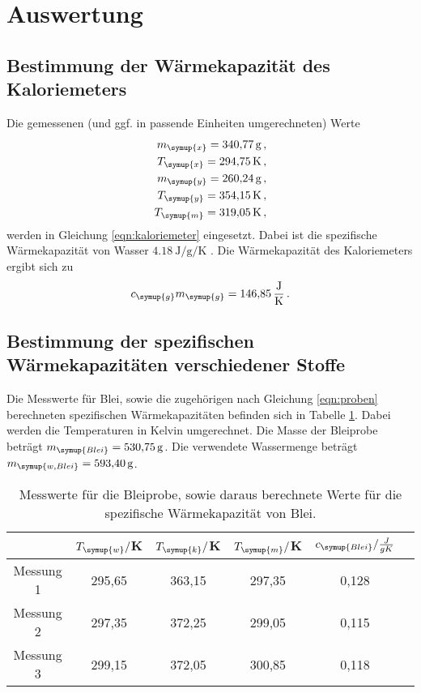 \section{Auswertung}
\label{sec:Auswertung}

\subsection{Bestimmung der Wärmekapazität des Kaloriemeters}
\label{sec:Auswertung_Kaloriemeter}

Die gemessenen (und ggf. in passende Einheiten umgerechneten) Werte
\begin{align*}
  m_{\symup{x}} = \SI{340.77}{\gram}   \,,\\
  T_{\symup{x}} = \SI{294.75}{\kelvin} \,,\\
  m_{\symup{y}} = \SI{260.24}{\gram}   \,,\\
  T_{\symup{y}} = \SI{354.15}{\kelvin} \,,\\
  T_{\symup{m}} = \SI{319.05}{\kelvin} \,,\\
\end{align*}
werden in Gleichung \eqref{eqn:kaloriemeter} eingesetzt. Dabei ist die spezifische Wärmekapazität
von Wasser $\SI{4.18}{\joule\per\gram\per\kelvin}$ \cite{Versuchsanleitung}. Die Wärmekapazität
des Kaloriemeters ergibt sich zu
\begin{equation}
  c_{\symup{g}}m_{\symup{g}} = \SI{146.85}{\joule\per\kelvin} \,.\nonumber
\end{equation}


\subsection{Bestimmung der spezifischen Wärmekapazitäten verschiedener Stoffe}
\label{sec:Auswertung_stoffe}

Die Messwerte für Blei, sowie die zugehörigen  nach Gleichung \ref{eqn:proben} berechneten spezifischen Wärmekapazitäten
befinden sich in Tabelle \ref{tab:blei}. Dabei werden die Temperaturen in Kelvin umgerechnet.
Die Masse der Bleiprobe beträgt $m_{\symup{Blei}}=\SI{530.75}{\gram}$. Die verwendete
Wassermenge beträgt $m_{\symup{w,Blei}}=\SI{593.40}{\gram}$.

\begin{table}[H]
  \centering
  \caption{Messwerte für die Bleiprobe, sowie daraus berechnete Werte für die spezifische
  Wärmekapazität von Blei.}
  \label{tab:blei}
  \begin{tabular}{c c c c c c}
    \toprule
    & $T_{\symup{w}}/$K & $T_{\symup{k}}/$K & $T_{\symup{m}}/$K & $c_{\symup{Blei}}/\frac{J}{g K}$ \\
    \midrule
    Messung 1 & 295,65 & 363,15 & 297,35 & 0,128 \\
    Messung 2 & 297,35 & 372,25 & 299,05 & 0,115 \\
    Messung 3 & 299,15 & 372,05 & 300,85 & 0,118 \\
    \bottomrule
  \end{tabular}
\end{table}

